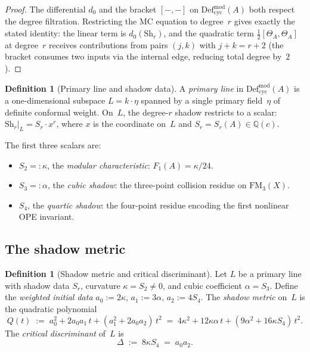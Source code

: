 \documentclass[11pt]{article}
\theoremstyle{plain}
\theoremstyle{definition}
\newtheorem{definition}[theorem]{Definition}
\theoremstyle{remark}
\newcommand{\Defcyc}{\mathrm{Def}_{\mathrm{cyc}}}
\newcommand{\Sh}{\mathrm{Sh}}
\newcommand{\FM}{\mathrm{FM}}
\begin{document}
\begin{proof}
The differential $d_0$ and the bracket $[-,-]$ on
$\Defcyc^{\mathrm{mod}}(A)$ both respect the degree filtration.
Restricting the MC equation to degree~$r$ gives exactly
the stated identity: the linear term is $d_0(\Sh_r)$, and
the quadratic term $\tfrac{1}{2}[\Theta_A, \Theta_A]$ at
degree~$r$ receives contributions from pairs $(j,k)$ with
$j + k = r + 2$ (the bracket consumes two inputs via the
internal edge, reducing total degree by~$2$).
\end{proof}

\begin{definition}[Primary line and shadow data]
\label{def:primary-line}
A \emph{primary line} in $\Defcyc^{\mathrm{mod}}(A)$ is a
one-dimensional subspace $L = k \cdot \eta$ spanned by a
single primary field~$\eta$ of definite conformal weight.
On~$L$, the degree-$r$ shadow restricts to a scalar:
$\Sh_r|_L = S_r \cdot x^r$, where $x$ is the coordinate
on~$L$ and $S_r = S_r(A) \in \mathbb{Q}(c)$.

The first three scalars are:
\begin{itemize}
\item $S_2 =: \kappa$, the \emph{modular characteristic}:
 $F_1(A) = \kappa/24$.
\item $S_3 =: \alpha$, the \emph{cubic shadow}:
 the three-point collision residue on $\FM_3(X)$.
\item $S_4$, the \emph{quartic shadow}:
 the four-point residue encoding the first nonlinear OPE
 invariant.
\end{itemize}
\end{definition}


\subsection{The shadow metric}

\begin{definition}[Shadow metric and critical discriminant]
\label{def:shadow-metric}
Let $L$ be a primary line with shadow data $S_r$, curvature
$\kappa = S_2 \neq 0$, and cubic coefficient $\alpha = S_3$.
Define the \emph{weighted initial data}
$a_0 := 2\kappa$, $a_1 := 3\alpha$, $a_2 := 4S_4$.
The \emph{shadow metric} on~$L$ is the quadratic polynomial
\begin{equation}\label{eq:shadow-metric}
 Q(t)
 \;:=\;
 a_0^2 + 2a_0 a_1\,t + (a_1^2 + 2a_0 a_2)\,t^2
 \;=\;
 4\kappa^2 + 12\kappa\alpha\,t
 + (9\alpha^2 + 16\kappa S_4)\,t^2.
\end{equation}
The \emph{critical discriminant} of~$L$ is
\begin{equation}\label{eq:critical-disc}
 \Delta \;:=\; 8\kappa S_4 \;=\; a_0 a_2.
\end{equation}
\end{definition}
\end{document}
